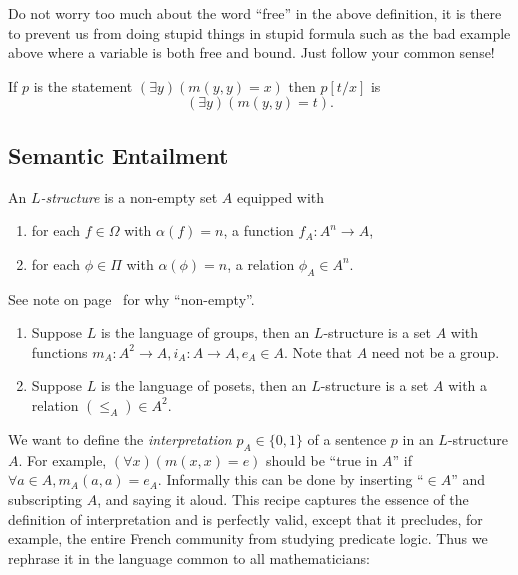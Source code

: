 \documentclass[a4paper]{article}
\begin{document}
Do not worry too much about the word ``free'' in the above definition, it is there to prevent us from doing stupid things in stupid formula such as the bad example above where a variable is both free and bound. Just follow your common sense!

\begin{eg}
  If \(p\) is the statement \((\exists y) (m(y, y) = x)\) then \(p[t/x]\) is
  \[
    (\exists y) (m(y, y) = t).
  \]
\end{eg}

\subsection{Semantic Entailment}

\begin{definition}[Structure]
  An \emph{\(L\)-structure} is a non-empty set \(A\) equipped with
  \begin{enumerate}
  \item for each \(f \in \Omega\) with \(\alpha(f) = n\), a function \(f_A: A^n \to A\),
  \item for each \(\phi \in \Pi\) with \(\alpha(\phi) = n\), a relation \(\phi_A \in A^n\).
  \end{enumerate}
\end{definition}

See note on page~\pageref{note:empty structure} for why ``non-empty''.

\begin{eg}\leavevmode
  \begin{enumerate}
  \item Suppose \(L\) is the language of groups, then an \(L\)-structure is a set \(A\) with functions \(m_A: A^2 \to A, i_A: A \to A, e_A \in A\). Note that \(A\) need not be a group.
  \item Suppose \(L\) is the language of posets, then an \(L\)-structure is a set \(A\) with a relation \((\leq_A) \in A^2\).
  \end{enumerate}
\end{eg}

We want to define the \emph{interpretation} \(p_A \in \{0, 1\}\) of a sentence \(p\) in an \(L\)-structure \(A\). For example, \((\forall x) (m(x, x) = e)\) should be ``true in \(A\)'' if \(\forall a \in A, m_A(a, a) = e_A\). Informally this can be done by inserting ``\(\in A\)'' and subscripting \(A\), and saying it aloud. This recipe captures the essence of the definition of interpretation and is perfectly valid, except that it precludes, for example, the entire French community from studying predicate logic. Thus we rephrase it in the language common to all mathematicians:
\end{document}
